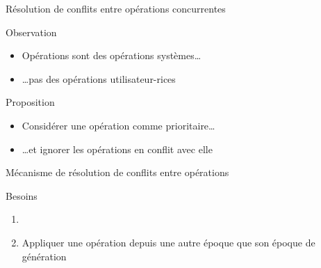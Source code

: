 \begin{frame}{Résolution de conflits entre opérations \ren concurrentes}
  \begin{block}{Observation}
    \begin{itemize}
      \item Opérations \ren sont des \alert{opérations systèmes}\dots
      \item \dots pas des \alert{opérations utilisateur-rices}
    \end{itemize}
  \end{block}
  \pause
  \begin{block}{Proposition}
    \begin{itemize}
      \item Considérer une \alert{opération \ren} comme \alert{prioritaire}\dots
      \item \dots et \alert{ignorer les opérations \ren en conflit} avec elle
    \end{itemize}
  \end{block}
\end{frame}

\begin{frame}{Mécanisme de résolution de conflits entre opérations \ren}
  \begin{block}{Besoins}
    \begin{enumerate}
      \item
      \item Appliquer une opération \ren depuis une autre époque que son époque de génération
    \end{enumerate}
  \end{block}
\end{frame}

